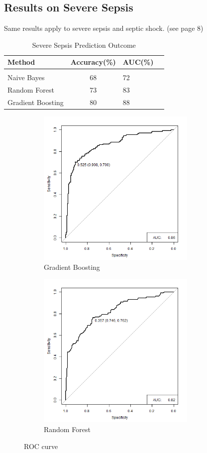 \documentclass[twoside,11pt]{article}
\begin{document}
\subsection{Results on Severe Sepsis}
Same results apply to severe sepsis and septic shock.
(see page 8)
\begin{table}[htbp]
 	\centering 
 	\begin{tabular}{lclc} 
 		Method & Accuracy(\%) & AUC(\%) \\ 
 		\hline \\[-11pt]
 		Naive Bayes & 68 & 72 \\ 
 		Random Forest & 73 & 83 \\ 
 		Gradient Boosting & 80 & 88 \\ \hline 
 	\end{tabular}
 	\label{tab:outcome} 
 	\caption{Severe Sepsis Prediction Outcome} 
\end{table}
\begin{figure}[htbp]
 	\begin{subfigure}{.5\textwidth}
 		\centering 
 		\includegraphics[width=3in]{gbm_severe_auc.png} 
 		\caption{Gradient Boosting}
 		\label{fig:gbm_severe} 
 	\end{subfigure}%
 	\begin{subfigure}{.5\textwidth}
 		\centering 
 		\includegraphics[width=3in]{rf_severe_auc.png} 
 		\caption{Random Forest}
 		\label{fig:rf_severe} 
 	\end{subfigure}
 	\caption{ROC curve}
 	\label{fig:fig}
\end{figure} 
\end{document}
